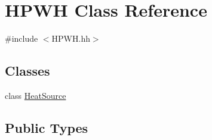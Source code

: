 \hypertarget{class_h_p_w_h}{\section{H\-P\-W\-H Class Reference}
\label{class_h_p_w_h}
}


{\ttfamily \#include $<$H\-P\-W\-H.\-hh$>$}

\subsection*{Classes}
\begin{DoxyCompactItemize}
\item 
class \hyperlink{class_h_p_w_h_1_1_heat_source}{Heat\-Source}
\end{DoxyCompactItemize}
\subsection*{Public Types}
